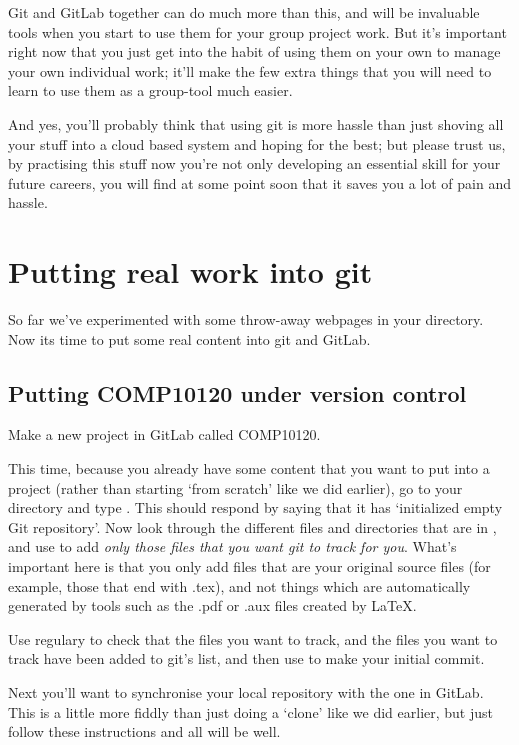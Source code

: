 Git and GitLab together can do much more than this, and will be invaluable tools when you start to use them for your group project work. But it's important right now that you just get into the habit of using them on your own to manage your own individual work; it'll make the few extra things that you will need to learn to use them as a group-tool much easier.

And yes, you'll probably think that using git is more hassle than just shoving all your stuff into a cloud based system and hoping for the best; but please trust us, by practising this stuff now you're not only developing an essential skill for your future careers, you will find at some point soon that it saves you a lot of pain and hassle. 

\section{Putting real work into git}

So far we've experimented with some throw-away webpages in your  directory. Now its time to put some real content into git and GitLab.

\subsection{Putting COMP10120 under version control}

Make a new project in GitLab called COMP10120. 

This time, because you already have some content that you want to put into a project (rather than starting `from scratch' like we did earlier), go to your  directory and type . This should respond by saying that it has `initialized empty Git repository'. Now look through the different files and directories that are in , and use  to add \emph{only those files that you want git to track for you}. What's important here is that you only add files that are your original source files (for example, those that end with .tex), and not things which are automatically generated by tools such as the .pdf or .aux files created by LaTeX.

Use  regulary to check that the files you want to track, and  the files you want to track have been added to git's list, and then use  to make your initial commit. 

Next you'll want to synchronise your local repository with the one in GitLab. This is a little more fiddly than just doing a `clone' like we did earlier, but just follow these instructions and all will be well.
 
